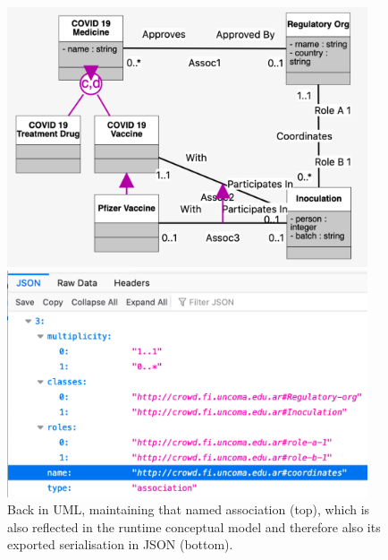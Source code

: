 \documentclass[sn-mathphys]{sn-jnl}
\begin{document}
\begin{figure}[h]
  \centering
      \includegraphics[width=0.95\textwidth]{covidUML3.pdf} 
            
      \vspace{1mm}
      
            \includegraphics[width=0.95\textwidth]{covidUML3json.pdf} 
    \caption{Back in UML, maintaining that named association (top), which is also reflected in the runtime conceptual model and therefore also its exported serialisation in JSON (bottom).}
    \label{fig:UMLmod}
\end{figure}
\end{document}
